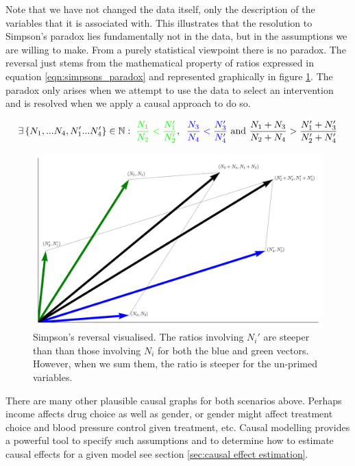 \documentclass[11pt,a4paper,oneside]{book}
\newcommand{\set}[1]{\left\{#1\right\}}
\newcommand{\eqn}[1]{\begin{align}#1\end{align}}
\theoremstyle{plain}
\theoremstyle{definition}
\begin{document}
Note that we have not changed the data itself, only the description of the variables that it is associated with. This illustrates that the resolution to Simpson's paradox lies fundamentally not in the data, but in the assumptions we are willing to make. From a purely statistical viewpoint there is no paradox. The reversal just stems from the mathematical property of ratios expressed in equation \ref{eqn:simpsons_paradox} and represented graphically in figure \ref{fig:simpsons_vector}. The paradox only arises when we attempt to use the data to select an intervention and is resolved when we apply a causal approach to do so.

\eqn{
\label{eqn:simpsons_paradox}
\exists \set{N_1,...N_4, N_1'...N_4'} \in \mathbb{N} : \; 
\textcolor{green}{\frac{N_1}{N_2}< \frac{N_1'}{N_2'}}, \;\; 
\textcolor{blue}{ \frac{N_3}{N_4}<\frac{N_3'}{N_4'}}
 \text{ and } \frac{N_1+N_3}{N_2+N_4} > \frac{N_1'+N_3'}{N_2'+N_4'}
}

\begin{figure}
\centering
\includegraphics[scale=.4]{figures/simpson_vector}
\caption{Simpson's reversal visualised. The ratios involving $N_i'$ are steeper than than those involving $N_i$ for both the blue and green vectors. However, when we sum them, the ratio is steeper for the un-primed variables.}
\label{fig:simpsons_vector}
\end{figure}

There are many other plausible causal graphs for both scenarios above. Perhaps income affects drug choice as well as gender, or gender might affect treatment choice and blood pressure control given treatment, etc. Causal modelling provides a powerful tool to specify such assumptions and to determine how to estimate causal effects for a given model see section \ref{sec:causal effect estimation}.
\end{document}
